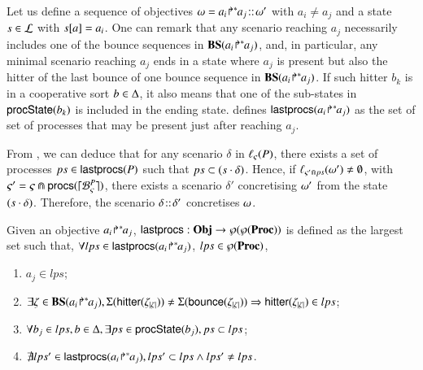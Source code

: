 Let us define a sequence of objectives $\omega={a_i\!\Rsh^*\!\!a_j}\!::\!\omega'$ with
$a_i\neq a_j$ and a state $s\in \mathcal{L}$ with $s[{a}]=a_i$.
One can remark that any scenario reaching $a_j$ necessarily includes one of the
bounce sequences in $\mathbf{BS}({a_i\!\Rsh^*\!\!a_j})$, and, in particular,
any minimal scenario reaching $a_j$ ends in a state where $a_j$ is present but
also the hitter of the last bounce of one bounce sequence in $\mathbf{BS}({a_i\!\Rsh^*\!\!a_j})$.
If such hitter $b_k$ is in a cooperative sort $b\in\Delta$, it also means that one of the sub-states
in $\mathsf{procState}(b_k)$ is included in the ending state.
 defines $\mathsf{lastprocs}({a_i\!\Rsh^*\!\!a_j})$ as the set of set of
processes that may be present just after reaching $a_j$.

From , we can deduce that
for any scenario $\delta$ in $\ell_\varsigma(P)$,
there exists a set of processes $ps\in\mathsf{lastprocs}(P)$
such that $ps \subset (s\cdot\delta)$.
Hence, if $\ell_{\varsigma'\Cap ps}(\omega')\neq\emptyset$,
with $\varsigma'=\varsigma\Cap\mathsf{procs}(\lceil \mathcal{B}_{\varsigma}^{P}\rceil)$,
there exists a scenario $\delta'$ concretising $\omega'$ from the
state $(s\cdot\delta)$.
Therefore, the scenario $\delta\!::\!\delta'$ concretises
$\omega$.

\begin{definition}[$\lastprocs$]
\label{def:lastprocs}
Given an objective ${a_i\!\Rsh^*\!\!a_j}$, $\mathsf{lastprocs}:
\mathbf{Obj}\to\wp(\wp(\mathbf{Proc}))$ is
defined as the largest set such that, $\forall lps\in\mathsf{lastprocs}({a_i\!\Rsh^*\!\!a_j})$, 
$lps\in\wp(\mathbf{Proc})$,
\begin{enumerate}
\item $a_j\in lps$;
\item $\exists\zeta\in\mathbf{BS}({a_i\!\Rsh^*\!\!a_j}),
    \Sigma(\mathsf{hitter}(\zeta_{|\zeta|})) \neq 
		\Sigma(\mathsf{bounce}(\zeta_{|\zeta|}))
		 \Rightarrow
		  \mathsf{hitter}(\zeta_{|\zeta|})\in lps$;
\item $\forall b_j\in lps, b\in\Delta, \exists ps\in\mathsf{procState}(b_j), ps\subset lps$;
\item $\nexists lps'\in\mathsf{lastprocs}({a_i\!\Rsh^*\!\!a_j}), lps'\subset lps \wedge
									lps'\neq lps$.
\end{enumerate}
\end{definition}

